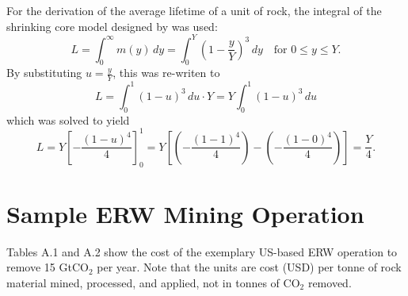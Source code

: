 \hfill \break
\break
For the derivation of the average lifetime of a unit of rock, the integral of the shrinking core model designed by \textcite{hangx_coastal_2009} was used:
\[
  L = \int_0^{\infty}m(y)\,dy= \int_0^Y\left(1-\frac{y}{Y}\right)^3\,dy \quad\text{for } 0 \le y \le Y.
\]
By substituting \(u = \frac{y}{Y}\), this was re-writen to
\[
  L = \int_0^1(1-u)^3\,du \cdot Y = Y\int_0^1(1-u)^3\,du
\]
which was solved to yield
\[
  L = Y\left[-\frac{(1-u)^4}{4}\right]_{0}^{1} = Y\left[\left(-\frac{(1-1)^4}{4}\right)-\left(-\frac{(1-0)^4}{4}\right)\right] = \frac{Y}{4}.
\]

\newpage
\section{Sample ERW Mining Operation}
Tables A.1 and A.2 show the cost of the exemplary US-based ERW operation to remove 15 GtCO$_2$ per year. Note that the units are cost (USD) per tonne of rock material mined, processed, and applied, not in tonnes of CO$_2$ removed.
